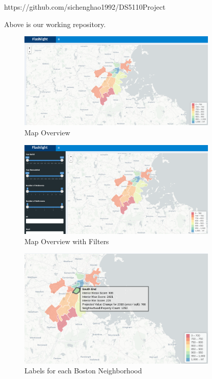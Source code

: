 \documentclass[12pt]{article}
\begin{document}
\begin{appendices}

https://github.com/sichenghao1992/DS5110Project

Above is our working repository.

\begin{figure}
  \caption{Map Overview}
  \centering
  \includegraphics[width=0.85\textwidth]{map_overview}
\end{figure}

\begin{figure}
  \caption{Map Overview with Filters}
  \centering
  \includegraphics[width=0.85\textwidth]{map_filter_overview}
\end{figure}

\begin{figure}
  \caption{Labels for each Boston Neighborhood}
  \centering
  \includegraphics[width=0.85\textwidth]{region_label}
\end{figure}


\end{appendices}
\end{document}
